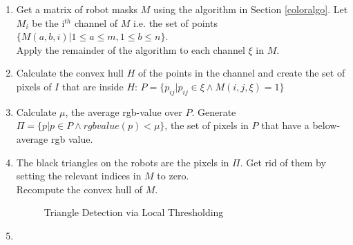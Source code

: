 \documentclass[10pt,a4paper]{article}
\begin{document}
\begin{enumerate}
    \item
    Get a matrix of robot masks $M$ using the algorithm in Section 
    \ref{coloralgo}. Let $M_i$ be the i$^{th}$ channel of $M$ i.e. the set of
    points $\{M(a,b,i) | 1 \le a \le m, 1 \le b \le n\}$.\\
    Apply the remainder of the algorithm to each channel $\xi$ in $M$.
    \item
    Calculate the convex hull $H$ of the points in the channel and create the 
    set of pixels of $I$ that are inside $H$: $P = \{p_{ij} | p_{ij} \in \xi 
    \land M(i,j,\xi) = 1\}$
    \item
    Calculate $\mu$, the average rgb-value over $P$. Generate 
    $\Pi = \{p | p \in P \land rgbvalue(p) < \mu\}$, the set of pixels in $P$ 
    that have a below-average rgb value.
    \item
    The black triangles on the robots are the pixels in $\Pi$. Get rid of them
    by setting the relevant indices in $M$ to zero.\\
    Recompute the convex hull of $M$.
    \begin{figure}[ht]
        \begin{center}
        \end{center}
        \caption{Triangle Detection via Local Thresholding}
        \label{trianglefig}
    \end{figure} 
    \item

\end{enumerate}
\end{document}
